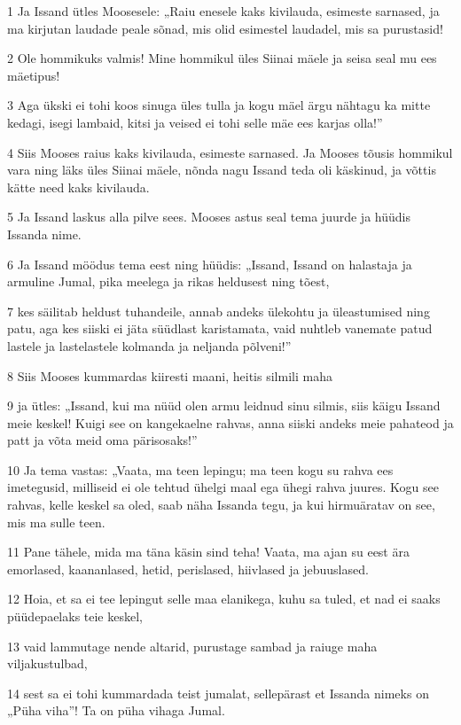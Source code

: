 \par 1 Ja Issand ütles Moosesele: „Raiu enesele kaks kivilauda, esimeste sarnased, ja ma kirjutan laudade peale sõnad, mis olid esimestel laudadel, mis sa purustasid!
\par 2 Ole hommikuks valmis! Mine hommikul üles Siinai mäele ja seisa seal mu ees mäetipus!
\par 3 Aga ükski ei tohi koos sinuga üles tulla ja kogu mäel ärgu nähtagu ka mitte kedagi, isegi lambaid, kitsi ja veised ei tohi selle mäe ees karjas olla!”
\par 4 Siis Mooses raius kaks kivilauda, esimeste sarnased. Ja Mooses tõusis hommikul vara ning läks üles Siinai mäele, nõnda nagu Issand teda oli käskinud, ja võttis kätte need kaks kivilauda.
\par 5 Ja Issand laskus alla pilve sees. Mooses astus seal tema juurde ja hüüdis Issanda nime.
\par 6 Ja Issand möödus tema eest ning hüüdis: „Issand, Issand on halastaja ja armuline Jumal, pika meelega ja rikas heldusest ning tõest,
\par 7 kes säilitab heldust tuhandeile, annab andeks ülekohtu ja üleastumised ning patu, aga kes siiski ei jäta süüdlast karistamata, vaid nuhtleb vanemate patud lastele ja lastelastele kolmanda ja neljanda põlveni!”
\par 8 Siis Mooses kummardas kiiresti maani, heitis silmili maha
\par 9 ja ütles: „Issand, kui ma nüüd olen armu leidnud sinu silmis, siis käigu Issand meie keskel! Kuigi see on kangekaelne rahvas, anna siiski andeks meie pahateod ja patt ja võta meid oma pärisosaks!”
\par 10 Ja tema vastas: „Vaata, ma teen lepingu; ma teen kogu su rahva ees imetegusid, milliseid ei ole tehtud ühelgi maal ega ühegi rahva juures. Kogu see rahvas, kelle keskel sa oled, saab näha Issanda tegu, ja kui hirmuäratav on see, mis ma sulle teen.
\par 11 Pane tähele, mida ma täna käsin sind teha! Vaata, ma ajan su eest ära emorlased, kaananlased, hetid, perislased, hiivlased ja jebuuslased.
\par 12 Hoia, et sa ei tee lepingut selle maa elanikega, kuhu sa tuled, et nad ei saaks püüdepaelaks teie keskel,
\par 13 vaid lammutage nende altarid, purustage sambad ja raiuge maha viljakustulbad,
\par 14 sest sa ei tohi kummardada teist jumalat, sellepärast et Issanda nimeks on „Püha viha”! Ta on püha vihaga Jumal.
